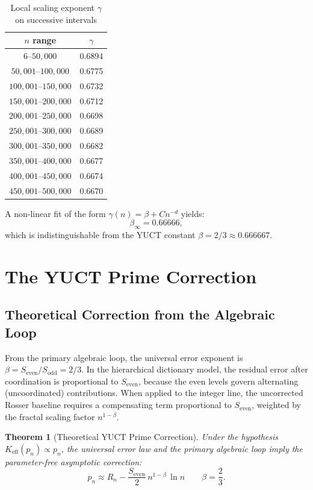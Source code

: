 \documentclass[12pt,a4paper]{article}
\newtheorem{theorem}{Theorem}[section]
\theoremstyle{remark}
\newcommand{\Sodd}{S_{\mathrm{odd}}}
\newcommand{\Seven}{S_{\mathrm{even}}}
\begin{document}
	\begin{table}[H]
		\centering
		\caption{Local scaling exponent \(\gamma\) on successive intervals}
		\label{tab:gamma}
		\begin{tabular}{cc}
			\toprule
			\(n\) range & \(\gamma\) \\
			\midrule
			\(6\)--\(50,000\) & 0.6894 \\
			\(50,001\)--\(100,000\) & 0.6775 \\
			\(100,001\)--\(150,000\) & 0.6732 \\
			\(150,001\)--\(200,000\) & 0.6712 \\
			\(200,001\)--\(250,000\) & 0.6698 \\
			\(250,001\)--\(300,000\) & 0.6689 \\
			\(300,001\)--\(350,000\) & 0.6682 \\
			\(350,001\)--\(400,000\) & 0.6677 \\
			\(400,001\)--\(450,000\) & 0.6674 \\
			\(450,001\)--\(500,000\) & 0.6670 \\
			\bottomrule
		\end{tabular}
	\end{table}
	
	A non-linear fit of the form \(\gamma(n) = \beta + C n^{-d}\) yields:
	\[
	\beta_{\infty} = 0.66666,
	\]
	which is indistinguishable from the YUCT constant \(\beta = 2/3 \approx 0.666667\).
	
	\section{The YUCT Prime Correction}
	
	\subsection{Theoretical Correction from the Algebraic Loop}
	
	From the primary algebraic loop, the universal error exponent is \(\beta = \Seven/\Sodd = 2/3\). In the hierarchical dictionary model, the residual error after coordination is proportional to \(\Seven\), because the even levels govern alternating (uncoordinated) contributions. When applied to the integer line, the uncorrected Rosser baseline requires a compensating term proportional to \(\Seven\), weighted by the fractal scaling factor \(n^{1-\beta}\).
	
	\begin{theorem}[Theoretical YUCT Prime Correction]
		Under the hypothesis \(K_{\mathrm{eff}}(p_n) \propto p_n\), the universal error law and the primary algebraic loop imply the parameter-free asymptotic correction:
		\[
		\boxed{ p_n \approx R_n - \frac{\Seven}{2}\, n^{1-\beta}\,\ln n }
		\qquad \beta = \frac{2}{3}.
		\]
	\end{theorem}
	
\end{document}

